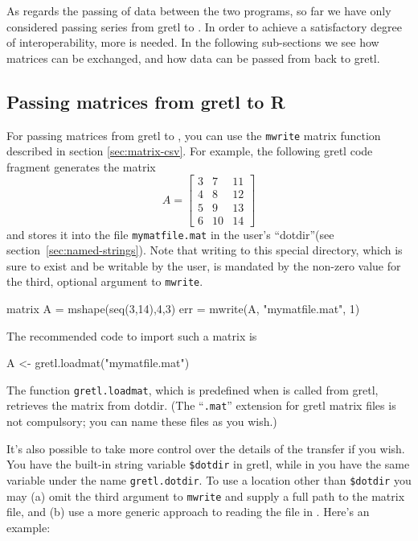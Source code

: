 As regards the passing of data between the two programs, so far we
have only considered passing series from gretl to . In
order to achieve a satisfactory degree of interoperability, more is
needed.  In the following sub-sections we see how matrices can be
exchanged, and how data can be passed from  back to
gretl.

\subsection{Passing matrices from gretl to R}

For passing matrices from gretl to , you can use the
\texttt{mwrite} matrix function described in section
\ref{sec:matrix-csv}. For example, the following gretl code
fragment generates the matrix 
\[ 
A = \left[
  \begin{array}{ccc}
    3 &  7 &  11 \\ 
    4 &  8 &  12 \\ 
    5 &  9 &  13 \\ 
    6 & 10 &  14 
  \end{array}
\right]
\] 
and stores it into the file \texttt{mymatfile.mat} in the user's
``dotdir''(see section~\ref{sec:named-strings}). Note that writing to
this special directory, which is sure to exist and be writable by the
user, is mandated by the non-zero value for the third, optional
argument to \texttt{mwrite}.
\begin{code}
  matrix A = mshape(seq(3,14),4,3)
  err = mwrite(A, "mymatfile.mat", 1)
\end{code}
The recommended  code to import such a matrix is
\begin{code}
  A <- gretl.loadmat("mymatfile.mat")
\end{code}

The function \texttt{gretl.loadmat}, which is predefined when 
is called from gretl, retrieves the matrix from dotdir.  (The
``\texttt{.mat}'' extension for gretl matrix files is not compulsory;
you can name these files as you wish.)

It's also possible to take more control over the details of the
transfer if you wish. You have the built-in string variable
\verb|$dotdir| in gretl, while in  you have the same variable
under the name \texttt{gretl.dotdir}. To use a location other than
\verb|$dotdir| you may (a) omit the third argument to \texttt{mwrite}
and supply a full path to the matrix file, and (b) use a more generic
approach to reading the file in . Here's an example:

